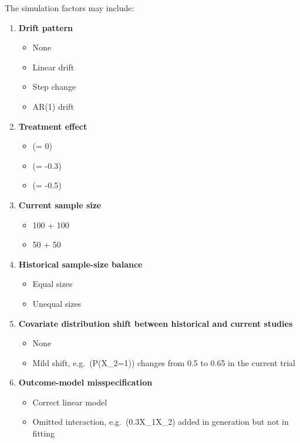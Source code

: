 \documentclass[
  letterpaper,
  DIV=11,
  numbers=noendperiod]{scrartcl}
\providecommand{\tightlist}{%
  \setlength{\itemsep}{0pt}\setlength{\parskip}{0pt}}
\begin{document}
The simulation factors may include:

\begin{enumerate}
\def\labelenumi{\arabic{enumi}.}
\tightlist
\item
  \textbf{Drift pattern}

  \begin{itemize}
  \tightlist
  \item
    None
  \item
    Linear drift
  \item
    Step change
  \item
    AR(1) drift
  \end{itemize}
\item
  \textbf{Treatment effect}

  \begin{itemize}
  \tightlist
  \item
    (\tau = 0)
  \item
    (\tau = -0.3)
  \item
    (\tau = -0.5)
  \end{itemize}
\item
  \textbf{Current sample size}

  \begin{itemize}
  \tightlist
  \item
    100 + 100
  \item
    50 + 50
  \end{itemize}
\item
  \textbf{Historical sample-size balance}

  \begin{itemize}
  \tightlist
  \item
    Equal sizes
  \item
    Unequal sizes
  \end{itemize}
\item
  \textbf{Covariate distribution shift between historical and current
  studies}

  \begin{itemize}
  \tightlist
  \item
    None
  \item
    Mild shift, e.g.~(P(X\_2=1)) changes from 0.5 to 0.65 in the current
    trial
  \end{itemize}
\item
  \textbf{Outcome-model misspecification}

  \begin{itemize}
  \tightlist
  \item
    Correct linear model
  \item
    Omitted interaction, e.g.~(0.3X\_1X\_2) added in generation but not
    in fitting
  \end{itemize}
\end{enumerate}
\end{document}
